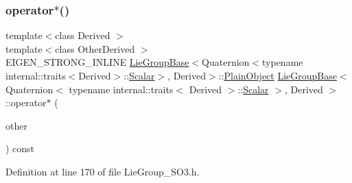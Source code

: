 \subsubsection{\texorpdfstring{operator$\ast$()}{operator*()}\hspace{0.1cm}{\footnotesize\ttfamily [3/3]}}
{\footnotesize\ttfamily template$<$class Derived $>$ \\
template$<$class Other\+Derived $>$ \\
E\+I\+G\+E\+N\+\_\+\+S\+T\+R\+O\+N\+G\+\_\+\+I\+N\+L\+I\+NE \hyperlink{class_lie_group_base}{Lie\+Group\+Base}$<$Quaternion$<$typename internal\+::traits$<$Derived$>$\+::\hyperlink{class_lie_group_base_3_01_quaternion_3_01typename_01internal_1_1traits_3_01_derived_01_4_1_1_scalar_01_4_00_01_derived_01_4_afadeceb3b98e52deecc572e71efb82a8}{Scalar}$>$, Derived$>$\+::\hyperlink{class_lie_group_base_3_01_quaternion_3_01typename_01internal_1_1traits_3_01_derived_01_4_1_1_scalar_01_4_00_01_derived_01_4_aadda973938291d3ccd25e606c6333a27}{Plain\+Object} \hyperlink{class_lie_group_base}{Lie\+Group\+Base}$<$ Quaternion$<$ typename internal\+::traits$<$ Derived $>$\+::\hyperlink{class_lie_group_base_3_01_quaternion_3_01typename_01internal_1_1traits_3_01_derived_01_4_1_1_scalar_01_4_00_01_derived_01_4_afadeceb3b98e52deecc572e71efb82a8}{Scalar} $>$, Derived $>$\+::operator$\ast$ (\begin{DoxyParamCaption}\item[{const \hyperlink{class_lie_group_base}{Lie\+Group\+Base}$<$ Quaternion$<$ \hyperlink{class_lie_group_base_3_01_quaternion_3_01typename_01internal_1_1traits_3_01_derived_01_4_1_1_scalar_01_4_00_01_derived_01_4_afadeceb3b98e52deecc572e71efb82a8}{Scalar} $>$, Other\+Derived $>$ \&}]{other }\end{DoxyParamCaption}) const}



Definition at line 170 of file Lie\+Group\+\_\+\+S\+O3.\+h.

\hypertarget{class_lie_group_base_3_01_quaternion_3_01typename_01internal_1_1traits_3_01_derived_01_4_1_1_scalar_01_4_00_01_derived_01_4_aa314e56672ce42df6f88b1cd36305908}{}\label{class_lie_group_base_3_01_quaternion_3_01typename_01internal_1_1traits_3_01_derived_01_4_1_1_scalar_01_4_00_01_derived_01_4_aa314e56672ce42df6f88b1cd36305908} 
